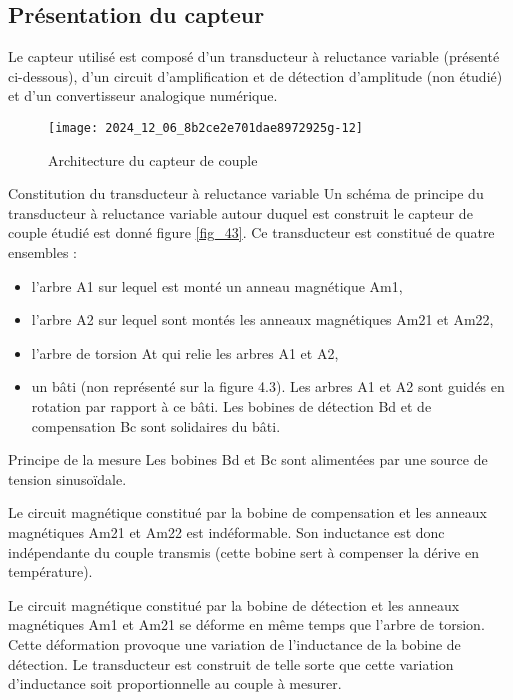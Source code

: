 \subsection{Présentation du capteur}
Le capteur utilisé est composé d'un transducteur à reluctance variable (présenté ci-dessous), d'un circuit d'amplification et de détection d'amplitude (non étudié) et d'un convertisseur analogique numérique.

\begin{figure}[!htb]
\begin{center}
\texttt{[image: 2024\_12\_06\_8b2ce2e701dae8972925g-12]}
\caption{Architecture du capteur de couple \label{fig_42}}
\end{center}
\end{figure}

Constitution du transducteur à reluctance variable Un schéma de principe du transducteur à reluctance variable autour duquel est construit le capteur de couple étudié est donné figure \ref{fig_43}. Ce transducteur est constitué de quatre ensembles :

\begin{itemize}
  \item l'arbre A1 sur lequel est monté un anneau magnétique Am1,
  \item l'arbre A2 sur lequel sont montés les anneaux magnétiques Am21 et Am22,
  \item l'arbre de torsion At qui relie les arbres A1 et A2,
  \item un bâti (non représenté sur la figure 4.3). Les arbres A1 et A2 sont guidés en rotation par rapport à ce bâti. Les bobines de détection Bd et de compensation Bc sont solidaires du bâti.
\end{itemize}

Principe de la mesure Les bobines Bd et Bc sont alimentées par une source de tension sinusoïdale.

Le circuit magnétique constitué par la bobine de compensation et les anneaux magnétiques Am21 et Am22 est indéformable. Son inductance est donc indépendante du couple transmis (cette bobine sert à compenser la dérive en température).

Le circuit magnétique constitué par la bobine de détection et les anneaux magnétiques Am1 et Am21 se déforme en même temps que l'arbre de torsion. Cette déformation provoque une variation de l'inductance de la bobine de détection. Le transducteur est construit de telle sorte que cette variation d'inductance soit proportionnelle au couple à mesurer.

